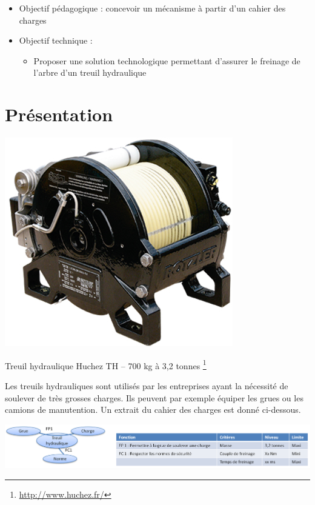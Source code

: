 \documentclass[11pt,oneside]{article}
\begin{document}
\begin{contexte}
\begin{itemize}
\item Objectif pédagogique : concevoir un mécanisme à partir d'un cahier des charges
\item Objectif technique : 
\begin{itemize}
\item Proposer une solution technologique permettant d'assurer le freinage de l'arbre d'un treuil hydraulique
\end{itemize}
\end{itemize}
\end{contexte}

\section*{Présentation}
\begin{minipage}[c]{.4\linewidth}

\begin{center}
\includegraphics[width=.5\textwidth]{png/treuil}

Treuil hydraulique Huchez TH -- 700 kg à 3,2 tonnes
\footnote{\url{http://www.huchez.fr/}}
\end{center}

\end{minipage}\hfill
\begin{minipage}[c]{.55\linewidth}
Les treuils hydrauliques sont utilisés par les entreprises ayant la nécessité de soulever de très grosses charges. Ils peuvent par exemple équiper les grues ou les camions de manutention. Un extrait du cahier des charges est donné ci-dessous.
\end{minipage}

\begin{center}
\includegraphics[width=.95\textwidth]{png/cdc}
\end{center}
\end{document}
